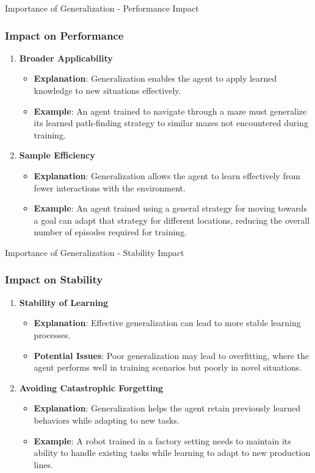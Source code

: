 \documentclass[aspectratio=169]{beamer}
\begin{document}
\begin{frame}[fragile]{Importance of Generalization - Performance Impact}
    \frametitle{Impact on Performance}
    \begin{enumerate}
        \item \textbf{Broader Applicability}
        \begin{itemize}
            \item \textbf{Explanation}: Generalization enables the agent to apply learned knowledge to new situations effectively.
            \item \textbf{Example}: An agent trained to navigate through a maze must generalize its learned path-finding strategy to similar mazes not encountered during training.
        \end{itemize}
        
        \item \textbf{Sample Efficiency}
        \begin{itemize}
            \item \textbf{Explanation}: Generalization allows the agent to learn effectively from fewer interactions with the environment.
            \item \textbf{Example}: An agent trained using a general strategy for moving towards a goal can adapt that strategy for different locations, reducing the overall number of episodes required for training.
        \end{itemize}
    \end{enumerate}
\end{frame}

\begin{frame}[fragile]{Importance of Generalization - Stability Impact}
    \frametitle{Impact on Stability}
    \begin{enumerate}
        \item \textbf{Stability of Learning}
        \begin{itemize}
            \item \textbf{Explanation}: Effective generalization can lead to more stable learning processes.
            \item \textbf{Potential Issues}: Poor generalization may lead to overfitting, where the agent performs well in training scenarios but poorly in novel situations.
        \end{itemize}

        \item \textbf{Avoiding Catastrophic Forgetting}
        \begin{itemize}
            \item \textbf{Explanation}: Generalization helps the agent retain previously learned behaviors while adapting to new tasks.
            \item \textbf{Example}: A robot trained in a factory setting needs to maintain its ability to handle existing tasks while learning to adapt to new production lines.
        \end{itemize}
    \end{enumerate}
\end{frame}
\end{document}
